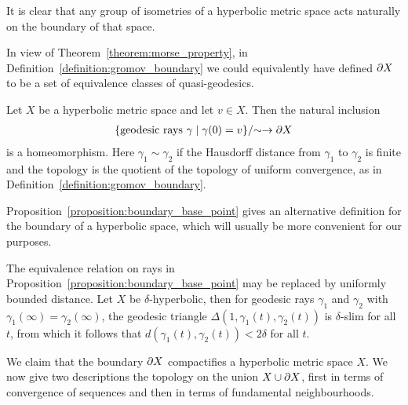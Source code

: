 It is clear that any group of isometries of a hyperbolic metric space acts naturally on the boundary of that space.

\begin{remark}\label{remark:boundary_through_quasi_geodesics}
  In view of Theorem~\ref{theorem:morse_property}, in Definition~\ref{definition:gromov_boundary} we could equivalently have defined $\partial X$ to be a set of equivalence classes of quasi-geodesics.
\end{remark}

\begin{proposition}\label{proposition:boundary_base_point}
  Let $X$ be a hyperbolic metric space and let $v \in X$.
  Then the natural inclusion
  \begin{align}
    \left.\{\text{\rm geodesic rays $\gamma$} \mid \gamma(0) = v\}\middle/\sim \to \partial X\right.
  \end{align}
  is a homeomorphism.
  Here $\gamma_1 \sim \gamma_2$ if the Hausdorff distance from $\gamma_1$ to $\gamma_2$ is finite and the topology is the quotient of the topology of uniform convergence, as in Definition~\ref{definition:gromov_boundary}.
\end{proposition}

Proposition~\ref{proposition:boundary_base_point} gives an alternative definition for the boundary of a hyperbolic space, which will usually be more convenient for our purposes.

\begin{remark}
  The equivalence relation on rays in Proposition~\ref{proposition:boundary_base_point} may be replaced by uniformly bounded distance. 
  Let $X$ be $\delta$-hyperbolic, then for geodesic rays $\gamma_1$ and $\gamma_2$ with $\gamma_1(\infty) = \gamma_2(\infty)$, the geodesic triangle $\Delta(1, \gamma_1(t), \gamma_2(t))$ is $\delta$-slim for all $t$, from which it follows that $d(\gamma_1(t), \gamma_2(t)) < 2\delta$ for all $t$.
\end{remark}

We claim that the boundary $\partial X$ compactifies a hyperbolic metric space $X$.
We now give two descriptions the topology on the union $X \cup \partial X$, first in terms of convergence of sequences and then in terms of fundamental neighbourhoods.

